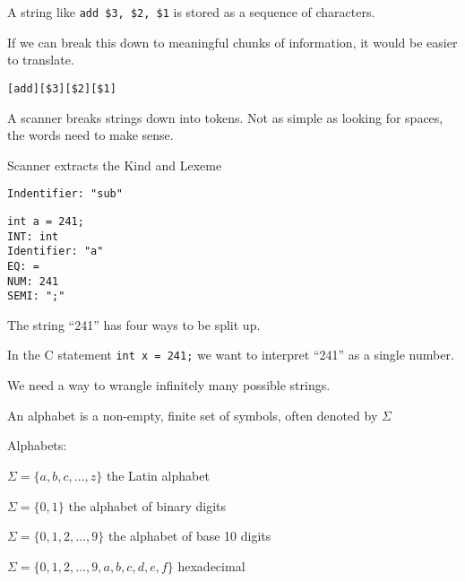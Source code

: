\documentclass{article}
\begin{document}
A string like \texttt{add\ \$3,\ \$2,\ \$1} is stored as a sequence of
characters.

If we can break this down to meaningful chunks of information, it would
be easier to translate.

\texttt{{[}add{]}{[}\$3{]}{[}\$2{]}{[}\$1{]}}

A scanner breaks strings down into tokens. Not as simple as looking for
spaces, the words need to make sense.

Scanner extracts the Kind and Lexeme

\texttt{Indentifier:\ "sub"}


\begin{tcolorbox}
    

\begin{verbatim}
int a = 241;
INT: int
Identifier: "a"
EQ: =
NUM: 241
SEMI: ";"
\end{verbatim}
\end{tcolorbox}


The string ``241'' has four ways to be split up.

In the C statement \texttt{int\ x\ =\ 241;} we want to interpret ``241''
as a single number.



We need a way to wrangle infinitely many possible strings.

 {An alphabet is a non-empty, finite set of
symbols, often denoted by \(\Sigma\)
}





Alphabets:

\(\Sigma = \{a,b,c,\ldots,z\}\) the Latin alphabet

\(\Sigma = \{0,1\}\) the alphabet of binary digits

\(\Sigma = \{0,1,2,\ldots,9\}\) the alphabet of base 10 digits

\(\Sigma = \{0,1,2,\ldots, 9, a, b, c, d, e, f\}\) hexadecimal
\end{document}

